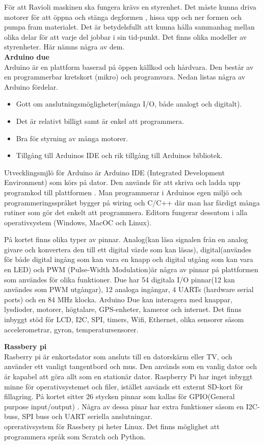 För att Ravioli maskinen ska fungera krävs en styrenhet. Det måste kunna driva motorer för att öppna och stänga degformen , hissa upp och ner formen och pumpa fram materialet. Det är betydelsfullt att kunna hålla sammanhag mellan olika delar för att varje del jobbar i sin tid-punkt. Det finns olika modeller av styrenheter. Här nämns några av dem.\\

\textbf{Arduino due}\\
Arduino är en plattform baserad på öppen källkod och hårdvara. Den består av en  programmerbar kretskort (mikro) och programvara. Nedan listas några av Arduino fördelar. 
\begin{itemize}
	\item Gott om anslutningsmögligheter(många I/O, både analogt och digitalt).
	\item Det är relativt billigt samt är enkel att programmera.
	\item Bra för styrning av många motorer.
	\item Tillgång till Arduinos IDE  och rik tillgång till Arduinos bibliotek.
\end{itemize}

Utvecklingsmjlö för Arduino är Arduino IDE (Integrated Development Environment) som körs på  dator. Den används för att skriva och ladda upp programkod till plattformen \cite{Arduino1}. Man programmerar i Arduinos egen miljö och programmeringsspråket bygger på wiring och C/C++ där man har färdigt många rutiner som gör det enkelt att programmera\cite{Arduino2}. Editorn fungerar dessutom i alla operativsystem (Windows, MacOC och Linux).
 
 På kortet finns olika typer av pinnar. Analog(kan läsa signalen från en analog givare och konvertera den till ett digital värde som  kan läsas), digital(användes för både digital ingång som kan vara en knapp och digital utgång som kan vara en LED) och  PWM (Pulse-Width Modulation)är några av  pinnar på plattformen som användes för olika funktioner. Due har 54 digitala I/O pinnar(12 kan användes som PWM utgångar), 12 analoga ingångar, 4 UARTs (hardware serial ports) och en  84 MHz klocka\cite{Arduino3}. Arduino Due kan interagera med knappar, lysdioder, motorer, högtalare, GPS-enheter, kameror och internet. Det finns inbyggt stöd för LCD, I2C, SPI, timers, Wifi, Ethernet, olika sensorer såsom accelerometrar, gyron, temperatursensorer. 
 
\textbf{Rassbery pi}\\
Rasberry pi är enkortsdator som ansluts till en datorskärm eller TV, och använder ett vanligt tangentbord och mus. Den  används som en vanlig dator och  är kapabel att göra allt som en stationär dator. Raspberry Pi har inget inbyggt minne för operativsystemet och filer, istället används ett externt SD-kort för fillagring. På kortet sitter 26 stycken pinnar som kallas för GPIO(General purpose input/output) . Några av dessa pinar har extra funktioner såsom en I2C-buss, SPI buss och UART seriella anslutningar\cite{Raspberry1}. \\

oprerativsystem för Rassbery pi heter Linux. Det finns möglighet att programmera språk som Scratch och Python.